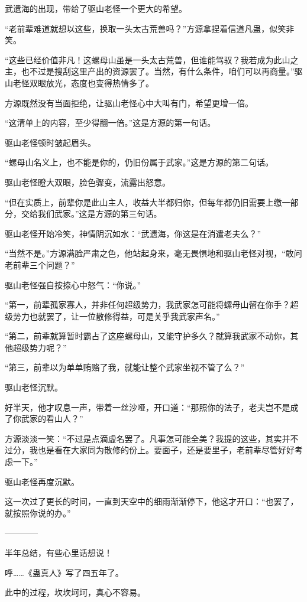 \begin{this_body}
武遗海的出现，带给了驱山老怪一个更大的希望。

“老前辈难道就想以这些，换取一头太古荒兽吗？”方源拿捏着信道凡蛊，似笑非笑。

“这些已经价值非凡！这螺母山虽是一头太古荒兽，但谁能驾驭？我若成为此山之主，也不过是搜刮这里产出的资源罢了。当然，有什么条件，咱们可以再商量。”驱山老怪双眼放光，态度也变得热情多了。

方源既然没有当面拒绝，让驱山老怪心中大叫有门，希望更增一倍。

“这清单上的内容，至少得翻一倍。”这是方源的第一句话。

驱山老怪顿时皱起眉头。

“螺母山名义上，也不能是你的，仍旧份属于武家。”这是方源的第二句话。

驱山老怪瞪大双眼，脸色骤变，流露出怒意。

“但在实质上，前辈你是此山主人，收益大半都归你，但每年都仍旧需要上缴一部分，交给我们武家。”这是方源的第三句话。

驱山老怪开始冷笑，神情阴沉如水：“武遗海，你这是在消遣老夫么？”

“当然不是。”方源满脸严肃之色，他站起身来，毫无畏惧地和驱山老怪对视，“敢问老前辈三个问题？”

驱山老怪强自按捺心中怒气：“你说。”

“第一，前辈孤家寡人，并非任何超级势力，我武家怎可能将螺母山留在你手？超级势力也就罢了，让一位散修得益，可是关乎我武家声名。”

“第二，前辈就算暂时霸占了这座螺母山，又能守护多久？就算我武家不动你，其他超级势力呢？”

“第三，前辈以为单单贿赂了我，就能让整个武家坐视不管了么？”

驱山老怪沉默。

好半天，他才叹息一声，带着一丝沙哑，开口道：“那照你的法子，老夫岂不是成了你武家的看山人？”

方源淡淡一笑：“不过是点滴虚名罢了。凡事怎可能全美？我提的这些，其实并不过分，我也是看在大家同为散修的份上。要面子，还是要里子，老前辈尽管好好考虑一下。”

驱山老怪再度沉默。

这一次过了更长的时间，一直到天空中的细雨渐渐停下，他这才开口：“也罢了，就按照你说的办。”

------------

半年总结，有些心里话想说！

呼……《蛊真人》写了四五年了。

此中的过程，坎坎坷坷，真心不容易。


\end{this_body}
